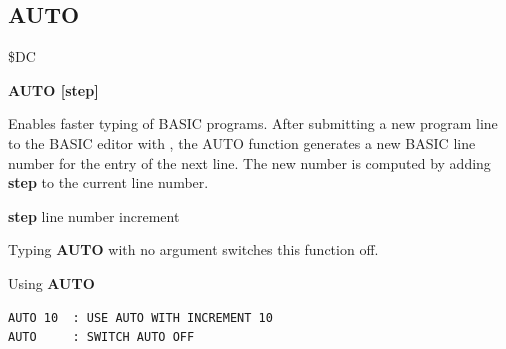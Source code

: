 
\newpage
\subsection{AUTO}
\begin{description}[leftmargin=2cm,style=nextline]
\item [Token:] \$DC
\item [Format:]
  {\bf AUTO [step]}
\item [Usage:] Enables faster typing of BASIC programs.
  After submitting a new program line to the BASIC editor with
  , the AUTO function generates a new BASIC line
  number for the entry of the next line. The new number is
  computed by adding {\bf step} to the current line number.

  {\bf step} line number increment

  Typing {\bf AUTO} with no argument switches this function off.

\item [Examples:] Using {\bf AUTO}
\begin{tcolorbox}[colback=black,coltext=white]
\verbatimfont{\codefont}
\begin{verbatim}
AUTO 10  : USE AUTO WITH INCREMENT 10
AUTO     : SWITCH AUTO OFF
\end{verbatim}
\end{tcolorbox}
\end{description}


\newpage
